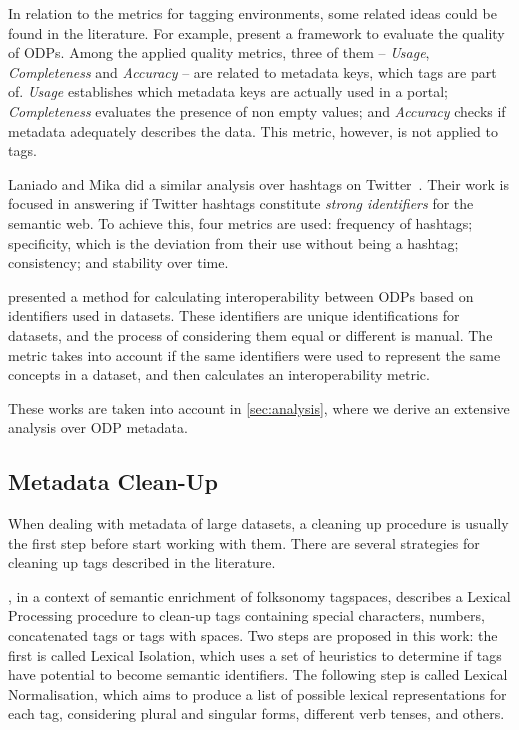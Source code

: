 In relation to the metrics for tagging environments, some related ideas could be found in the literature.
For example,  present a framework to evaluate the quality of ODPs. 
Among the applied quality metrics, three of them -- \emph{Usage}, \emph{Completeness} and \emph{Accuracy} -- are related to metadata keys, which tags are part of. 
\emph{Usage} establishes which metadata keys are actually used in a portal; \emph{Completeness} evaluates the presence of non empty values; and \emph{Accuracy} checks if metadata adequately describes the data.
This metric, however, is not applied to tags.

Laniado and Mika did a similar analysis over hashtags on Twitter~\cite{Laniado2010}.
Their work is focused in answering if Twitter hashtags constitute \emph{strong identifiers} for the semantic web. 
To achieve this, four metrics are used: frequency of hashtags; specificity, which is the deviation from their use without being a hashtag; consistency; and stability over time.

 presented a method for calculating interoperability between ODPs based on  identifiers used in datasets.
These identifiers are unique identifications for datasets, and the process of considering them equal or different is manual.
The metric takes into account if the same identifiers were used to represent the same concepts in a dataset, and then calculates an interoperability metric.

These works are taken into account in \autoref{sec:analysis}, where we derive an extensive analysis over ODP metadata.

\subsection{Metadata Clean-Up}
\label{sec:metadata_cleanup}

When dealing with metadata of large datasets, a cleaning up procedure is usually the first step before start working with them.
There are several strategies for cleaning up tags described in the literature.

, in a context of semantic enrichment of folksonomy tagspaces, describes a Lexical Processing procedure to clean-up tags containing special characters, numbers, concatenated tags or tags with spaces.
Two steps are proposed in this work: the first is called Lexical Isolation, which uses a set of heuristics to determine if tags have potential to become semantic identifiers.
The following step is called Lexical Normalisation, which aims to produce a list of possible lexical representations for each tag, considering plural and singular forms, different verb tenses, and others.

